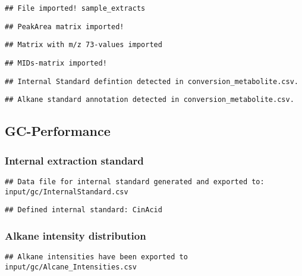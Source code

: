 \documentclass[9pt,]{article}
\begin{document}
\begin{verbatim}
## File imported! sample_extracts
\end{verbatim}

\begin{verbatim}
## PeakArea matrix imported!
\end{verbatim}

\begin{verbatim}
## Matrix with m/z 73-values imported
\end{verbatim}

\begin{verbatim}
## MIDs-matrix imported!
\end{verbatim}

\begin{verbatim}
## Internal Standard defintion detected in conversion_metabolite.csv.
\end{verbatim}

\begin{verbatim}
## Alkane standard annotation detected in conversion_metabolite.csv.
\end{verbatim}

\subsection{GC-Performance}\label{gc-performance}

\subsubsection{Internal extraction
standard}\label{internal-extraction-standard}

\begin{verbatim}
## Data file for internal standard generated and exported to: input/gc/InternalStandard.csv
\end{verbatim}

\begin{verbatim}
## Defined internal standard: CinAcid
\end{verbatim}

\subsubsection{Alkane intensity
distribution}\label{alkane-intensity-distribution}

\begin{verbatim}
## Alkane intensities have been exported to input/gc/Alcane_Intensities.csv
\end{verbatim}
\end{document}
